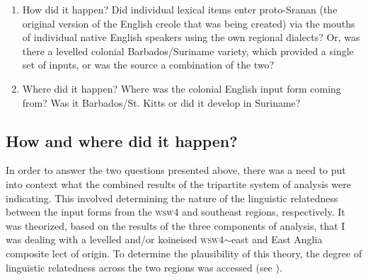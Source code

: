 \begin{enumerate}
\item{How did it happen? Did individual lexical items enter proto-Sranan (the original version of the English creole that was being created) via the mouths of individual native English speakers using the own regional dialects? Or, was there a levelled colonial Barbados/Suriname variety, which provided a single set of inputs, or was the source a combination
of the two?}
\item{Where did it happen? Where was the colonial English input form coming from? Was it Barbados/St. Kitts or did it develop in Suriname?}
\end{enumerate}

\subsection{How and where did it happen?}\label{7.2.1}
In order to answer the two questions presented above, there was a need to put into context what the combined results of the tripartite system of analysis were indicating. This involved determining the nature of the linguistic relatedness between the input forms from the \textsc{wsw4} and southeast regions, respectively. It was theorized, based on the results of the three components of analysis, that I was dealing with a levelled and/or koineised \textsc{wsw4}$\sim$east and East Anglia composite lect of origin. To determine the plausibility of this theory, the degree of linguistic relatedness across the two regions was accessed (see ).


